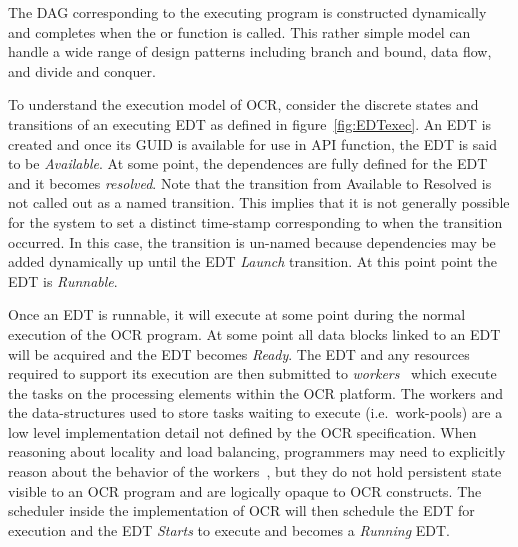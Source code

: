 The DAG corresponding
to the executing program is constructed dynamically and completes when the
 or  function is called.
This rather simple model can handle a wide range of
design patterns including branch and bound, data flow, and divide and
conquer.
%
%

To understand the execution model of OCR, consider the discrete states and
transitions of an executing EDT as defined in figure~\ref{fig:EDTexec}.  An
EDT is created and once its GUID is available for use in API function, the EDT is said
to be \emph{Available}.  At some point, the dependences
are fully defined for the EDT and it becomes \emph{resolved}.
Note that the transition from Available to Resolved is not called out as a named transition.
This implies that it is not generally possible for the system to set a distinct time-stamp
corresponding to when the transition occurred.  In this case, the transition is un-named
because dependencies may be added dynamically up until the
EDT \emph{Launch} transition.  At this point point the
EDT is \emph{Runnable}.

Once an EDT is runnable,  it will execute at some point during the normal execution
of the OCR program.   At some point all data blocks linked to an EDT will be acquired and the
EDT becomes \emph{Ready}. The
EDT  and any resources required
to support its execution are then submitted to
\emph{workers}~\cite{GBRS09} which execute the tasks on
the processing elements within the OCR platform. The workers and the
data-structures used to store tasks waiting to execute
(i.e.\ work-pools) are a low level implementation detail not defined by
the OCR specification. When reasoning about locality and load
balancing, programmers may need to explicitly reason about the
behavior of the workers~\cite{Chatterjee13}, but they do not hold
persistent state visible to an OCR program and are logically opaque to
OCR constructs. The scheduler inside the implementation of OCR
will then schedule the EDT for execution and the EDT  \emph{Starts} to execute and
becomes a \emph{Running} EDT.


